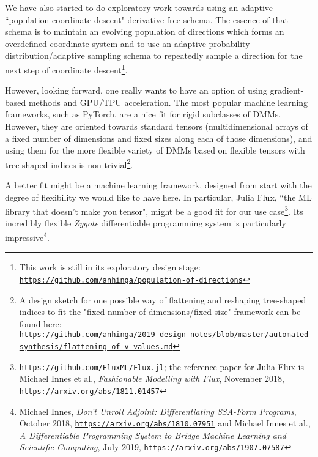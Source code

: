 \documentclass{article}
\begin{document}
We have also started to do
exploratory work towards using an adaptive ``population coordinate descent" derivative-free schema. The essence of
that schema is to maintain an evolving
population of directions which forms an overdefined coordinate system and to use an adaptive probability distribution/adaptive
sampling schema to repeatedly sample a direction for the next step of coordinate descent\footnote{This work is
still in its exploratory design stage: 
\href{https://github.com/anhinga/population-of-directions}{\tt https://github.com/anhinga/population-of-directions}}.

However, looking forward, one really wants to have an option of using gradient-based methods and GPU/TPU
acceleration. The most popular machine learning frameworks, such as PyTorch, are a nice fit for rigid subclasses
of DMMs. However, they are oriented towards standard tensors (multidimensional arrays of a
fixed number of dimensions and fixed sizes along each of those dimensions), and using them for the more flexible variety of DMMs based on flexible tensors
with tree-shaped indices is non-trivial\footnote{A design sketch for one possible way of flattening and reshaping
tree-shaped indices to fit the "fixed number of dimensions/fixed size" framework can be found
here:\\
\href{https://github.com/anhinga/2019-design-notes/blob/master/automated-synthesis/flattening-of-v-values.md}
{\tt https://github.com/anhinga/2019-design-notes/blob/master/automated-synthesis/flattening-of-v-values.md}}.

A better fit might be a machine learning framework, designed from start with the degree of flexibility
we would like to have here. In particular, Julia Flux, ``the ML library that doesn't make you tensor", might be a good fit
for our use case\footnote{\href{https://github.com/FluxML/Flux.jl}{\tt https://github.com/FluxML/Flux.jl};
the reference paper for Julia Flux is Michael Innes et al., {\em Fashionable Modelling with Flux}, November 2018,
\href{https://arxiv.org/abs/1811.01457}{\tt https://arxiv.org/abs/1811.01457}}. Its incredibly flexible {\em Zygote}
differentiable programming system is particularly impressive\footnote{Michael Innes,
{\em Don't Unroll Adjoint: Differentiating SSA-Form Programs}, October 2018,
\href{https://arxiv.org/abs/1810.07951}{\tt https://arxiv.org/abs/1810.07951} and 
Michael Innes et al., {\em A Differentiable Programming System to Bridge Machine Learning and Scientific Computing}, 
July 2019, \href{https://arxiv.org/abs/1907.07587}{\tt https://arxiv.org/abs/1907.07587}}.
\end{document}
